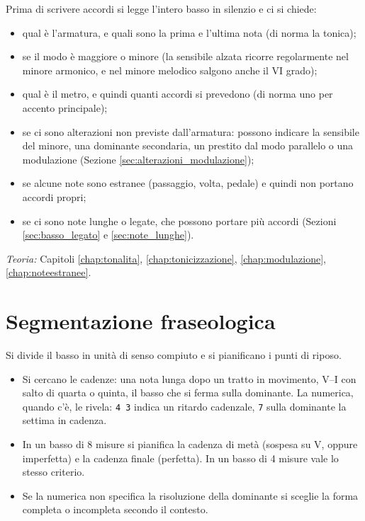 Prima di scrivere accordi si legge l'intero basso in silenzio e ci si chiede:
\begin{itemize}
	\item qual è l'armatura, e quali sono la prima e l'ultima nota (di norma la tonica);
	\item se il modo è maggiore o minore (la sensibile alzata ricorre regolarmente nel minore armonico, e nel minore melodico salgono anche il VI grado);
	\item qual è il metro, e quindi quanti accordi si prevedono (di norma uno per accento principale);
	\item se ci sono alterazioni non previste dall'armatura: possono indicare la sensibile del minore, una dominante secondaria, un prestito dal modo parallelo o una modulazione (Sezione \ref{sec:alterazioni_modulazione});
	\item se alcune note sono estranee (passaggio, volta, pedale) e quindi non portano accordi propri;
	\item se ci sono note lunghe o legate, che possono portare più accordi (Sezioni \ref{sec:basso_legato} e \ref{sec:note_lunghe}).
\end{itemize}

\textit{Teoria:} Capitoli \ref{chap:tonalita}, \ref{chap:tonicizzazione}, \ref{chap:modulazione}, \ref{chap:noteestranee}.

\section{Segmentazione fraseologica}
\label{sec:fase2_numerato}

Si divide il basso in unità di senso compiuto e si pianificano i punti di riposo.
\begin{itemize}
	\item Si cercano le cadenze: una nota lunga dopo un tratto in movimento, V--I con salto di quarta o quinta, il basso che si ferma sulla dominante. La numerica, quando c'è, le rivela: \texttt{4 3} indica un ritardo cadenzale, \texttt{7} sulla dominante la settima in cadenza.
	\item In un basso di 8 misure si pianifica la cadenza di metà (sospesa su V, oppure imperfetta) e la cadenza finale (perfetta). In un basso di 4 misure vale lo stesso criterio.
	\item Se la numerica non specifica la risoluzione della dominante si sceglie la forma completa o incompleta secondo il contesto.
\end{itemize}

